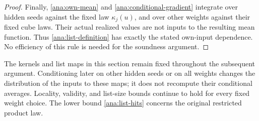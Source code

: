 \begin{proof}
Finally, \eqref{ana:own-mean} and
\eqref{ana:conditional-gradient} integrate over hidden seeds
against the fixed law \(\kappa_j(u)\), and over other weights against
their fixed cube laws. Their actual realized values are not inputs
to the resulting mean function. Thus \eqref{ana:list-definition}
has exactly the stated own-input dependence. No efficiency of this
rule is needed for the soundness argument.
\end{proof}

The kernels and list maps in this section remain fixed throughout
the subsequent argument. Conditioning later on other hidden seeds
or on all weights changes the distribution of the inputs to these
maps; it does not recompute their conditional averages. Locality,
validity, and list-size bounds continue to hold for every fixed
weight choice. The lower bound \eqref{ana:list-hits} concerns the
original restricted product law.
